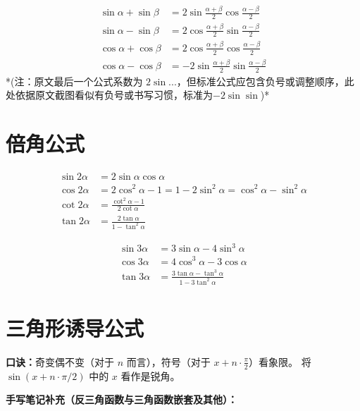 \documentclass[a4paper,12pt]{ctexart}
\begin{document}
\begin{align*}
    \sin \alpha + \sin \beta &= 2\sin\frac{\alpha+\beta}{2}\cos\frac{\alpha-\beta}{2} \\
    \sin \alpha - \sin \beta &= 2\cos\frac{\alpha+\beta}{2}\sin\frac{\alpha-\beta}{2} \\
    \cos \alpha + \cos \beta &= 2\cos\frac{\alpha+\beta}{2}\cos\frac{\alpha-\beta}{2} \\
    \cos \alpha - \cos \beta &= -2\sin\frac{\alpha+\beta}{2}\sin\frac{\alpha-\beta}{2}
\end{align*}
*(注：原文最后一个公式系数为 $2\sin...$，但标准公式应包含负号或调整顺序，此处依据原文截图看似有负号或书写习惯，标准为$-2\sin\sin$)*

\section*{倍角公式}

\begin{align*}
    \sin 2\alpha &= 2\sin \alpha \cos \alpha \\
    \cos 2\alpha &= 2\cos^2 \alpha - 1 = 1 - 2\sin^2 \alpha = \cos^2 \alpha - \sin^2 \alpha \\
    \cot 2\alpha &= \frac{\cot^2 \alpha - 1}{2\cot \alpha} \\
    \tan 2\alpha &= \frac{2\tan \alpha}{1 - \tan^2 \alpha}
\end{align*}

\begin{align*}
    \sin 3\alpha &= 3\sin \alpha - 4\sin^3 \alpha \\
    \cos 3\alpha &= 4\cos^3 \alpha - 3\cos \alpha \\
    \tan 3\alpha &= \frac{3\tan \alpha - \tan^3 \alpha}{1 - 3\tan^2 \alpha}
\end{align*}

\section*{三角形诱导公式}

\noindent\textbf{口诀：}奇变偶不变（对于 $n$ 而言），符号（对于 $x + n \cdot \frac{\pi}{2}$）看象限。
将$\sin(x + n \cdot \pi/2)$ 中的 $x$ 看作是锐角。

\vspace{0.5cm}
\noindent\textbf{手写笔记补充（反三角函数与三角函数嵌套及其他）：}
\end{document}

